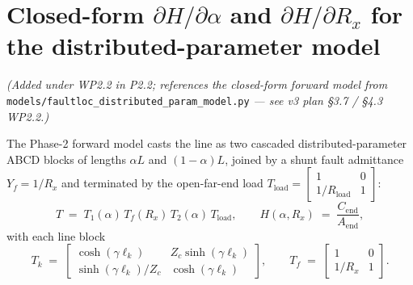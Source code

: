 \documentclass[11pt,a4paper]{article}
\begin{document}
\section{Closed-form $\partial H/\partial\alpha$ and
         $\partial H/\partial R_x$ for the distributed-parameter model}
\label{sec:dHdtheta}

\textit{(Added under WP2.2 in P2.2; references the closed-form
forward model from
}\texttt{models/faultloc\_distributed\_param\_model.py}\textit{ — see
v3 plan §3.7 / §4.3 WP2.2.)}

The Phase-2 forward model casts the line as two cascaded
distributed-parameter ABCD blocks of lengths $\alpha L$ and
$(1-\alpha)L$, joined by a shunt fault admittance $Y_f = 1/R_x$ and
terminated by the open-far-end load
$T_{\text{load}} = \begin{bmatrix} 1 & 0 \\ 1/R_{\text{load}} & 1
\end{bmatrix}$:
\begin{equation}
   T \;=\; T_1(\alpha)\, T_f(R_x)\, T_2(\alpha)\, T_{\text{load}},
   \qquad
   H(\alpha, R_x) \;=\; \frac{C_{\text{end}}}{A_{\text{end}}},
   \label{eq:Tend_dist}
\end{equation}
with each line block
\begin{equation}
   T_k \;=\;
   \begin{bmatrix}
     \cosh(\gamma\ell_k) & Z_c \sinh(\gamma\ell_k)\\
     \sinh(\gamma\ell_k)/Z_c & \cosh(\gamma\ell_k)
   \end{bmatrix},
   \qquad
   T_f \;=\;
   \begin{bmatrix} 1 & 0 \\ 1/R_x & 1 \end{bmatrix}.
\end{equation}
\end{document}
